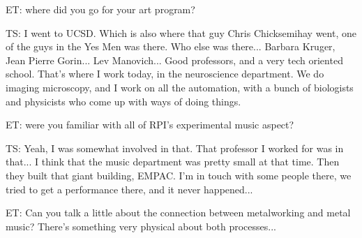 ET: where did you go for your art program? 

TS: I went to UCSD. Which is also where that guy Chris Chicksemihay went, one of the guys in the Yes Men was there. Who else was there... Barbara Kruger, Jean Pierre Gorin... Lev Manovich... Good professors, and a very tech oriented school. That's where I work today, in the neuroscience department. We do imaging microscopy, and I work on all the automation, with a bunch of biologists and physicists who come up with ways of doing things. 

ET: were you familiar with all of RPI's experimental music aspect? 

TS: Yeah, I was somewhat involved in that. That professor I worked for was in that... I think that the music department was pretty small at that time. Then they built that giant building, EMPAC. I'm in touch with some people there, we tried to get a performance there, and it never happened... 

ET: Can you talk a little about the connection between metalworking and metal music? There's something very physical about both processes...

